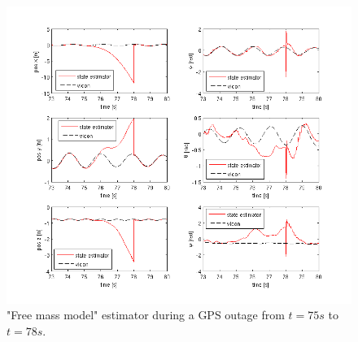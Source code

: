 \begin{figure}[h]
\centering
\includegraphics[width=1\textwidth]{pictures/2_2_fmm_SNR5_detail_GPSoutage.png}
\caption{"Free mass model" estimator during a GPS outage from $t=75 s$ to $t=78 s$.}
\label{detail_fmm_outage}
\end{figure}


